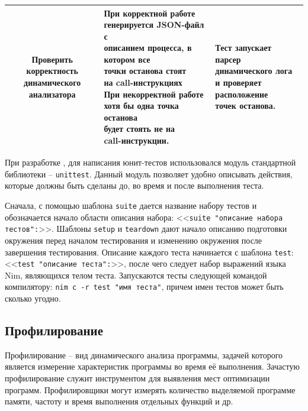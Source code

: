 \begin{table}
{\begin{longtable}{|c|l|l|}
                \makecell{Проверить корректность \\
                    динамического анализатора} & 
                \makecell[l]{
                    При корректной работе\\
                    генерируется JSON-файл с\\
                    описанием процесса, в котором все\\
                    точки останова стоят\\
                    на call-инструкциях
                    \\
                    При некорректной работе\\
                    хотя бы одна точка останова\\
                    будет стоять не на \\
                    call-инструкции.} & 
                \makecell[l]{Тест запускает парсер\\
                    динамического лога \\
                    и проверяет расположение\\
                    точек останова.}\\
                \hline
        \end{longtable}
    }
\end{table}

При разработке {\ProgModule}, для написания юнит-тестов использовался
модуль стандартной библиотеки -- \verb|unittest|. 
Данный модуль позволяет удобно описывать действия, которые должны быть
сделаны до, во время и после выполнения теста.

Сначала, с помощью шаблона \verb|suite| дается название набору тестов 
и обозначается начало области описания набора:
<<\verb|suite "описание набора тестов":|>>.
Шаблоны \verb|setup| и \verb|teardown| дают начало описанию подготовки
окружения перед началом тестирования и изменению окружения после завершения
тестирования. Описание каждого теста начинается с шаблона \verb|test|: 
<<\verb|test "описание теста":|>>, после чего следует набор выражений языка
Nim, являющихся телом теста.
Запускаются тесты следующей командой компилятору:
\verb|nim c -r test "имя теста"|, причем имен тестов может быть сколько угодно.


\subsection{Профилирование {\ProgModule}}\label{sec:ch3/sec1/sub3}
Профилирование -- вид динамического анализа программы, задачей которого
является измерение характеристик программы во время её выполнения.
Зачастую профилирование служит инструментом для выявления мест 
оптимизации программ. Профилировщики могут измерять количество выделяемой
программе памяти, частоту и время выполнения отдельных функций и др.

